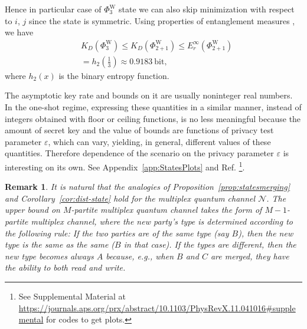 \documentclass[aps,pra,twocolumn,superscriptaddress,longbibliography]{revtex4-1}
\newcommand{\mc}[1]{\mathcal{#1}}
\newtheorem{remark}{Remark}
\begin{document}
Hence in particular case of $\Phi_{3}^\mathrm{W}$ state we can also skip minimization with respect to $i$, $j$ since the state is symmetric. Using properties of entanglement measures \cite{Horodecki_2000,Ishizaka_2005,plenio2005introduction}, we have
\begin{align}
&K_D\left( \Phi_{3}^\mathrm{W}\right) \le 
K_D\left( \Phi_{2+1}^\mathrm{W}\right) \le E_r^{\infty}\left(\Phi_{2+1}^\mathrm{W}\right)\\
&=h_2\left(\frac{1}{3}\right)\approx 0.9183~ \mathrm{bit},
\end{align}
where $h_2(x)$ is the binary entropy function.

The asymptotic key rate and bounds on it are usually noninteger real numbers. In the one-shot regime, expressing these quantities in a similar manner, instead of integers obtained with floor or ceiling functions, is no less meaningful because the amount of secret key and the value of bounds are functions of privacy test parameter $\varepsilon$, which can vary, yielding, in general, different values of these quantities. Therefore dependence of the scenario on the privacy parameter $\varepsilon$ is interesting on its own. See Appendix~\ref{app:StatesPlots} and Ref. \footnote{See Supplemental Material at \url{https://journals.aps.org/prx/abstract/10.1103/PhysRevX.11.041016#supplemental} for codes to
get plots.}.

\begin{remark}
	It is natural that the analogies of Proposition~\ref{prop:statesmerging} and Corollary~\ref{cor:dist-state} hold for the multiplex quantum channel $\mc{N}$. The upper bound on $M$-partite multiplex quantum channel takes the form of $M-1$-partite multiplex channel, where the new party's type is determined according to the following rule: If the two parties are of the same type (say $B$), then the new type is the same as the same ($B$ in that case). If the types are different, then the new type becomes always $A$ because, e.g., when $B$ and $C$ are merged, they have the ability to both read and write.
\end{remark}
\end{document}

